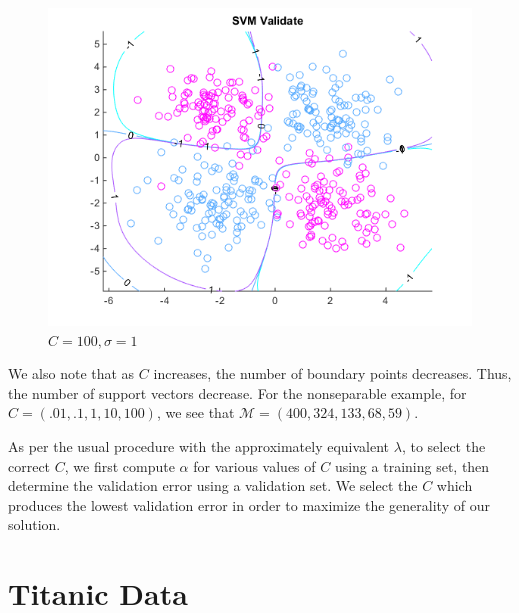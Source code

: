 \documentclass[10pt,letterpaper]{article}
\begin{document}
\begin{center}
\begin{figure}[!htb]
  \includegraphics[width=\linewidth]{figures/C100sigma1.png}
  \caption{$C = 100, \sigma = 1$}
\endminipage
\end{figure}
\end{center}

We also note that as $C$ increases, the number of boundary points decreases. Thus, the number of support vectors decrease. For the nonseparable example, for $C = (.01, .1, 1, 10, 100)$, we see that $\mathcal{M} = (400, 324, 133, 68, 59)$.

As per the usual procedure with the approximately equivalent $\lambda$, to select the correct $C$, we first compute $\alpha$ for various values of $C$ using a training set, then determine the validation error using a validation set. We select the $C$ which produces the lowest validation error in order to maximize the generality of our solution.


\section{Titanic Data}
\end{document}
